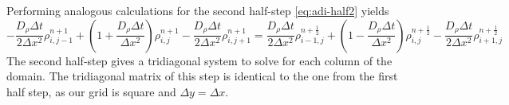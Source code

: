\documentclass[a4paper]{article}
\begin{document}
Performing analogous calculations for the second half-step \ref{eq:adi-half2} yields
\begin{equation}
	-\frac{D_\rho \Delta t}{2 \Delta x^2} \rho_{i,j-1}^{n + 1} + \left( 1 + \frac{D_\rho \Delta t}{\Delta x^2} \right) \rho_{i,j}^{n + 1} - \frac{D_\rho \Delta t}{2 \Delta x^2} \rho_{i,j+1}^{n + 1} 
	= \frac{D_\rho \Delta t}{2 \Delta x^2} \rho_{i-1,j}^{n + \frac{1}{2}} + \left( 1 - \frac{D_\rho \Delta t}{\Delta x^2} \right) \rho_{i,j}^{n + \frac{1}{2}} - \frac{D_\rho \Delta t}{2 \Delta x^2} \rho_{i+1,j}^{n + \frac{1}{2}}
\end{equation}
The second half-step gives a tridiagonal system to solve for each column of the domain.
The tridiagonal matrix of this step is identical to the one from the first half step, as our grid is square and $\Delta y = \Delta x$.
\end{document}
